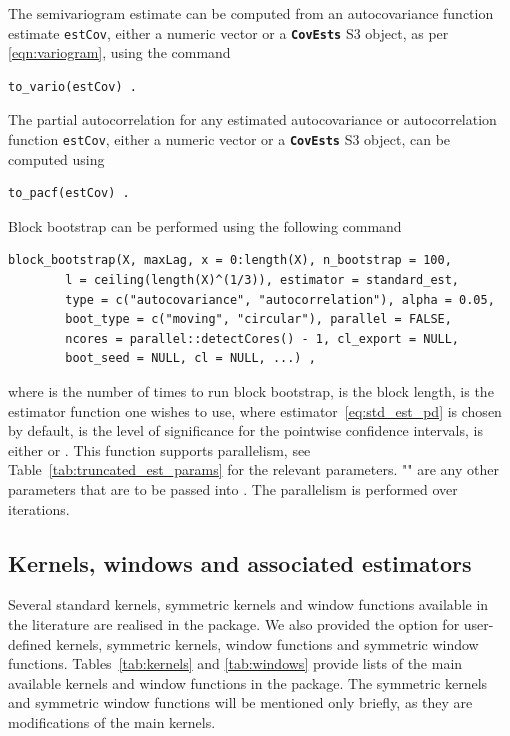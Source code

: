 The semivariogram estimate can be computed from an autocovariance
function estimate \texttt{estCov}, either a numeric vector or a
\textbf{\texttt{CovEsts}} S3 object, as per \eqref{eqn:variogram}, using
the command

\begin{verbatim}
to_vario(estCov) .
\end{verbatim}

The partial autocorrelation for any estimated autocovariance or
autocorrelation function \texttt{estCov}, either a numeric vector or a
\textbf{\texttt{CovEsts}} S3 object, can be computed using

\begin{verbatim}
to_pacf(estCov) .
\end{verbatim}

Block bootstrap can be performed using the following command

\begin{verbatim}
block_bootstrap(X, maxLag, x = 0:length(X), n_bootstrap = 100,
        l = ceiling(length(X)^(1/3)), estimator = standard_est,
        type = c("autocovariance", "autocorrelation"), alpha = 0.05,
        boot_type = c("moving", "circular"), parallel = FALSE,
        ncores = parallel::detectCores() - 1, cl_export = NULL,
        boot_seed = NULL, cl = NULL, ...) ,
\end{verbatim}

where  is the number of times to run block bootstrap,
 is the block length,  is the estimator function
one wishes to use, where estimator~\eqref{eq:std_est_pd} is chosen by
default,  is the level of significance for the pointwise
confidence intervals,  is either  or
. This function supports parallelism, see
Table~\ref{tab:truncated_est_params} for the relevant parameters.
"" are any other parameters that are to be passed into
. The parallelism is performed over 
iterations.

\subsection{Kernels, windows and associated
estimators}\label{kernels-windows-and-associated-estimators}

Several standard kernels, symmetric kernels and window functions
available in the literature are realised in the package. We also
provided the option for user-defined kernels, symmetric kernels, window
functions and symmetric window functions. Tables~\ref{tab:kernels} and
\ref{tab:windows} provide lists of the main available kernels and window
functions in the package. The symmetric kernels and symmetric window
functions will be mentioned only briefly, as they are modifications of
the main kernels.

